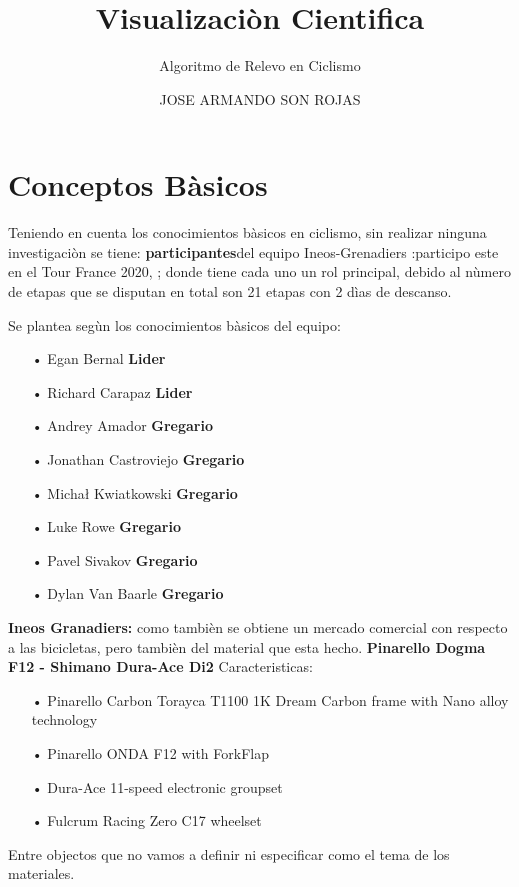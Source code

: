 \documentclass[english]{article}
\begin{document}
   \author*[1]{JOSE ARMANDO SON ROJAS}
  \title{Visualizaciòn Cientifica}
  \subtitle{Algoritmo de Relevo en Ciclismo}

\maketitle  

\section{Conceptos Bàsicos} 

Teniendo en cuenta los conocimientos bàsicos en ciclismo, sin realizar ninguna investigaciòn se tiene: \textbf{participantes}del equipo Ineos-Grenadiers
:participo este en el Tour France 2020, \citet[2020]{8 participantes}; donde tiene cada uno un rol principal, debido al nùmero de etapas que se disputan en total son 21 etapas con 2 dìas de descanso.

Se plantea segùn los conocimientos bàsicos del equipo:
\begin{itemize}
\item[•]Egan Bernal \textbf{Lider}
\item[•]Richard Carapaz \textbf{Lider}
\item[•]Andrey Amador \textbf{Gregario}
\item[•]Jonathan Castroviejo \textbf{Gregario}
\item[•]Michał Kwiatkowski \textbf{Gregario}
\item[•]Luke Rowe  \textbf{Gregario}
\item[•]Pavel Sivakov \textbf{Gregario}
\item[•]Dylan Van Baarle  \textbf{Gregario}
\end{itemize}

\textbf{Ineos Granadiers:} como tambièn se obtiene un mercado comercial con respecto a las bicicletas, pero tambièn del material que esta hecho. \textbf{Pinarello Dogma F12 - Shimano Dura-Ace Di2
}
Caracteristicas:
\begin{itemize}
\item[•]Pinarello Carbon Torayca T1100 1K Dream Carbon frame with Nano alloy technology
\item[•]Pinarello ONDA F12 with ForkFlap
\item[•]Dura-Ace 11-speed electronic groupset
\item[•]Fulcrum Racing Zero C17 wheelset
\end{itemize}
Entre objectos que no vamos a definir ni especificar como el tema de los materiales.
\end{document}
